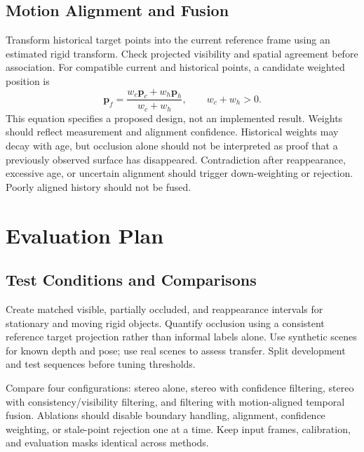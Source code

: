 \subsection{Motion Alignment and Fusion}
Transform historical target points into the current reference frame using an estimated rigid transform. Check projected visibility and spatial agreement before association. For compatible current and historical points, a candidate weighted position is
\begin{equation}
\mathbf p_f=\frac{w_c\mathbf p_c+w_h\mathbf p_h}{w_c+w_h},\qquad w_c+w_h>0.
\end{equation}
This equation specifies a proposed design, not an implemented result. Weights should reflect measurement and alignment confidence. Historical weights may decay with age, but occlusion alone should not be interpreted as proof that a previously observed surface has disappeared. Contradiction after reappearance, excessive age, or uncertain alignment should trigger down-weighting or rejection. Poorly aligned history should not be fused.

\section{Evaluation Plan}
\subsection{Test Conditions and Comparisons}
Create matched visible, partially occluded, and reappearance intervals for stationary and moving rigid objects. Quantify occlusion using a consistent reference target projection rather than informal labels alone. Use synthetic scenes for known depth and pose; use real scenes to assess transfer. Split development and test sequences before tuning thresholds.

Compare four configurations: stereo alone, stereo with confidence filtering, stereo with consistency/visibility filtering, and filtering with motion-aligned temporal fusion. Ablations should disable boundary handling, alignment, confidence weighting, or stale-point rejection one at a time. Keep input frames, calibration, and evaluation masks identical across methods.

